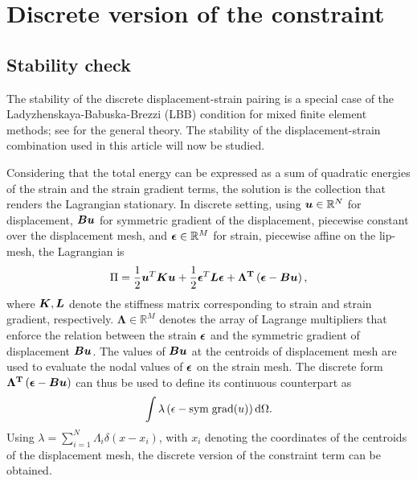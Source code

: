 \documentclass[10pt]{cas-sc}
\newenvironment{addedblock}{}{}
\begin{document}
\section{Discrete version of the constraint\label{discrete_version_of_gradient}}

\begin{addedblock}
\subsection{Stability check \label{stab_check_lip_disp}}
The stability of the discrete displacement-strain pairing is a special case of the Ladyzhenskaya-Babuska-Brezzi (LBB) condition for mixed finite element methods; see \cite{auricchio2017mixed} for the general theory. The stability of the displacement-strain combination used in this article will now be studied.

Considering that the total energy can be expressed as a sum of quadratic energies of the strain and the strain gradient terms, the solution is the collection that renders the Lagrangian stationary. In discrete setting, using $\mbox{\boldmath $u$} \in \mathbb{R} ^N$ for displacement, $\mbox{\boldmath $B$} \mbox{\boldmath $u$}$ for symmetric gradient of the displacement, piecewise constant over the displacement mesh, and $\mbox{\boldmath $\epsilon$} \in \mathbb{R}^M$ for strain, piecewise affine on the lip-mesh, the Lagrangian is
\begin{equation}
\Pi = \frac{1}{2} \mbox{\boldmath $u$} ^T \mbox{\boldmath $K$} \mbox{\boldmath $u$} + \frac{1}{2} \mbox{\boldmath $\epsilon$} ^T \mbox{\boldmath $L$} \mbox{\boldmath $\epsilon$} + \bf \Lambda ^T \left(\mbox{\boldmath $\epsilon$} - \mbox{\boldmath $B$} \mbox{\boldmath $u$} \right),
\end{equation}
where $\mbox{\boldmath $K$},\mbox{\boldmath $L$} $ denote the stiffness matrix corresponding to strain and strain gradient, respectively. $\mathbf{\Lambda} \in \mathbb{R}^M$ denotes the array of Lagrange multipliers that enforce the relation between the strain $\mbox{\boldmath $\epsilon$}$ and the symmetric gradient of displacement $\mbox{\boldmath $B$} \mbox{\boldmath $u$}$. The values of $\mbox{\boldmath $B$} \mbox{\boldmath $u$}$ at the centroids of displacement mesh are used to evaluate the nodal values of $\mbox{\boldmath $\epsilon$} $ on the strain mesh. The discrete form $\bf \Lambda ^T \left(\mbox{\boldmath $\epsilon$} - \mbox{\boldmath $B$} \mbox{\boldmath $u$} \right)$ can thus be used to define its continuous counterpart as
\begin{equation}
 \int \lambda \left( {\epsilon} - {\rm sym \; grad}(u) \right) \mathop{}\!\mathrm{d} \Omega.
\end{equation}
Using $\lambda = \sum_{i=1}^{N} \Lambda_i \delta (x-x_i) $, with $x_i$ denoting the coordinates of the centroids of the displacement mesh, the discrete version of the constraint term can be obtained.



\end{addedblock}
\end{document}
